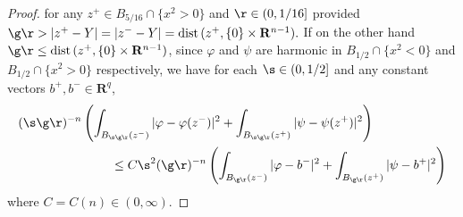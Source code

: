 \documentclass[a4paper,11pt]{amsart}
\begin{document}
\begin{proof}
for any $z^{+} \in B_{5/16} \cap \{x^{2} >0\}$ and $\r \in (0, 1/16]$ provided $\g\r > |z^{+} - Y| = |z^{-} - Y| = {\rm dist} \, (z^{+}, \{0\} \times {\mathbf R}^{n-1}).$ If on the other hand $\g\r \leq {\rm dist} \, (z^{+}, \{0\} \times {\mathbf R}^{n-1})$, since $\varphi$ and $\psi$ are harmonic in $B_{1/2} \cap \{x^{2} < 0\}$ and $B_{1/2} \cap \{x^{2} > 0\}$ respectively, we have for each $\s \in (0, 1/2]$ and any constant vectors $b^{+}, b^{-} \in {\mathbf R}^{q}$, 
\begin{eqnarray}\label{continuity-4}
(\s\g\r)^{-n}\left(\int_{B_{\s\g\r}(z^{-})}|\varphi - \varphi(z^{-})|^{2} + \int_{B_{\s\g\r}(z^{+})} |\psi - \psi(z^{+})|^{2}\right)&&\nonumber\\
&&\hspace{-3in} \leq  C\s^{2}(\g\r)^{-n}
\left(\int_{B_{\g\r}(z^{-})}|\varphi - b^{-}|^{2} + \int_{B_{\g\r}(z^{+})} |\psi - b^{+}|^{2}\right) 
\end{eqnarray}
where $C = C(n) \in (0, \infty).$


\end{proof}
\end{document}
